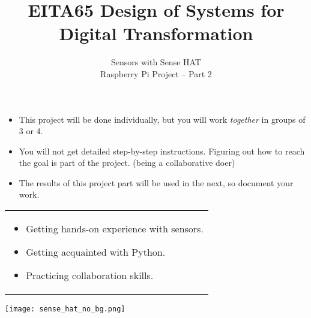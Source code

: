 \documentclass{article}
\title{EITA65 Design of Systems for Digital Transformation\\\year}
\author{\huge Sensors with Sense HAT\\Raspberry Pi Project -- Part 2}
\date{}
\begin{document}
\clearpage\maketitle
\thispagestyle{empty}%

\begin{itemize}
\item This project will be done individually, but you will work \textit{together} in groups of 3 or 4.
\item You will not get detailed step-by-step instructions. Figuring out how to reach the goal is part of the project. (being a collaborative doer)
\item The results of this project part will be used in the next, so document your work.
\end{itemize}

\vspace{.1cm}
\begin{center}
\begin{tabular}{l}
\toprule[1.5pt]
\parbox{0.8\linewidth}{
\vspace{.2cm}{\Large Learning goals:}
\begin{itemize}
\item Getting hands-on experience with sensors.
\item Getting acquainted with Python.
\item Practicing collaboration skills.
\end{itemize}}\\
\bottomrule[1.5pt]
\end{tabular}
\end{center}

\vfill
\begin{center}
\texttt{[image: sense\_hat\_no\_bg.png]}
\end{center}
\vspace{2cm}
\end{document}
